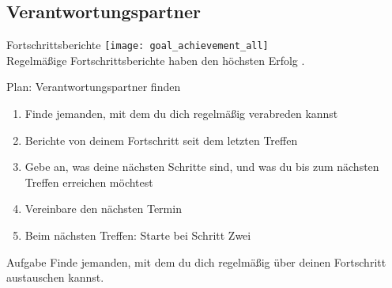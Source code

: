 \subsection{Verantwortungspartner}


\begin{frame}[c]{Fortschrittsberichte}
    \small
    \texttt{[image: goal\_achievement\_all]} \\
    Regelmäßige Fortschrittsberichte haben den höchsten Erfolg \cite{better-goals-2}.
\end{frame}


\begin{frame}[c]{Plan: Verantwortungspartner finden}
    \begin{enumerate}[<+(1)->]
        \item Finde jemanden, mit dem du dich regelmäßig verabreden kannst
        \item Berichte von deinem Fortschritt seit dem letzten Treffen
        \item Gebe an, was deine nächsten Schritte sind, und was du bis zum nächsten Treffen erreichen möchtest
        \item Vereinbare den nächsten Termin
        \item Beim nächsten Treffen: Starte bei Schritt Zwei
    \end{enumerate}
\end{frame}


\begin{frame}[c]
    \begin{block}{Aufgabe}
        Finde jemanden, mit dem du dich regelmäßig über deinen
        Fortschritt austauschen kannst.
    \end{block}
\end{frame}

